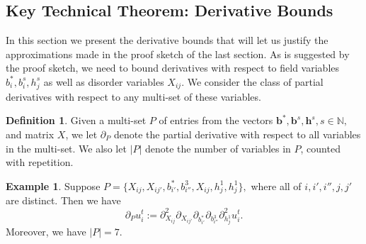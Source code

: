 \documentclass{article}
\newcommand{\1}{\mathbbm{1}}
\theoremstyle{plain}
\theoremstyle{definition}
\newtheorem{definition}[theorem]{Definition}
\newtheorem{example}[theorem]{Example}
\theoremstyle{remark}
\newtheorem{remark}[theorem]{Remark}
\newcommand{\eps}{\varepsilon}
\newcommand{\bfu}{\boldsymbol{u}}
\newcommand{\bfv}{\boldsymbol{v}}
\newcommand{\bfeps}{\boldsymbol{\eps}}
\newcommand{\bfh}{\boldsymbol{h}}
\newcommand{\bfb}{\boldsymbol{b}}
\newcommand{\bftheta}{\boldsymbol{\theta}}
\newcommand{\N}{\mathbb{N}}
\begin{document}
\subsection{Key Technical Theorem: Derivative Bounds}\label{sec:derivative-bounds}
In this section we present the derivative bounds that will let us justify the approximations made in the proof sketch of the last section. As is suggested by the proof sketch, we need to bound derivatives with respect to field variables $b^*_i,b_i^s,h_j^s$ as well as disorder variables $X_{ij}.$ We consider the class of partial derivatives with respect to any multi-set of these variables.
\begin{definition}\label{defn:P-partial-derivatives}
    Given a multi-set $P$ of entries from the vectors $\bfb^*,\bfb^s,\bfh^s, s\in \N,$ and matrix $X$, we let $\partial_P$ denote the partial derivative with respect to all variables in the multi-set. We also let $|P|$ denote the number of variables in $P$, counted with repetition.
\end{definition}
\begin{example}\label{ex:P-example}
    Suppose $P = \{X_{ij}, X_{ij'}, b_{i'}^*, b^3_{i''}, X_{ij}, h_j^1, h_j^1\},$ where all of $i,i',i'',j,j'$ are distinct. Then we have
    \[
    \partial_P u_i^t := \partial_{X_{ij}}^2 \partial_{X_{ij'}} \partial_{b^*_{i'}} \partial_{b_{i''}^3} \partial_{h_j^1}^2 u_i^t.
    \]
    Moreover, we have $|P|=7.$
\end{example}
\end{document}
